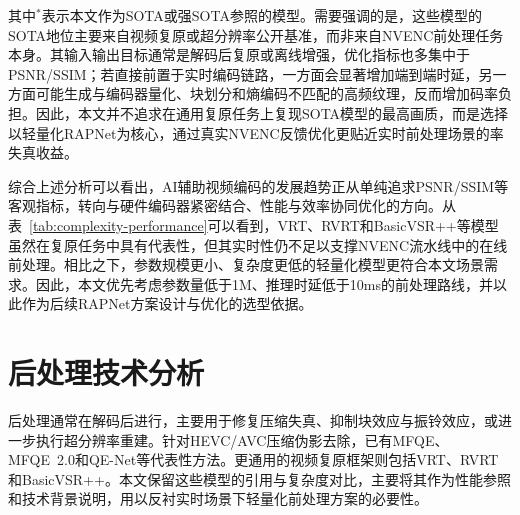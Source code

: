 \begin{table}[htbp]
  \centering
  \caption{主流模型复杂度与性能综合对比}
  \label{tab:complexity-performance}
  \small
  \setlength{\tabcolsep}{4pt}
\end{table}

其中$^{\ast}$表示本文作为SOTA或强SOTA参照的模型。需要强调的是，这些模型的SOTA地位主要来自视频复原或超分辨率公开基准，而非来自NVENC前处理任务本身。其输入输出目标通常是解码后复原或离线增强，优化指标也多集中于PSNR/SSIM；若直接前置于实时编码链路，一方面会显著增加端到端时延，另一方面可能生成与编码器量化、块划分和熵编码不匹配的高频纹理，反而增加码率负担。因此，本文并不追求在通用复原任务上复现SOTA模型的最高画质，而是选择以轻量化RAPNet为核心，通过真实NVENC反馈优化更贴近实时前处理场景的率失真收益。

综合上述分析可以看出，AI辅助视频编码的发展趋势正从单纯追求PSNR/SSIM等客观指标，转向与硬件编码器紧密结合、性能与效率协同优化的方向\cite{ref16-ding2021advances}。从表~\ref{tab:complexity-performance}可以看到，VRT、RVRT和BasicVSR++等模型虽然在复原任务中具有代表性，但其实时性仍不足以支撑NVENC流水线中的在线前处理。相比之下，参数规模更小、复杂度更低的轻量化模型更符合本文场景需求。因此，本文优先考虑参数量低于1M、推理时延低于10ms的前处理路线，并以此作为后续RAPNet方案设计与优化的选型依据。

\section{后处理技术分析}

后处理通常在解码后进行，主要用于修复压缩失真、抑制块效应与振铃效应，或进一步执行超分辨率重建\cite{ref2-chan2021basicvsr}。针对HEVC/AVC压缩伪影去除，已有MFQE\cite{ref51-yang2018mfqe}、MFQE~2.0\cite{ref52-guan2021mfqe2}和QE-Net\cite{ref55-yang2018qenet}等代表性方法。更通用的视频复原框架则包括VRT\cite{ref22-liang2022vrt}、RVRT\cite{ref23-liang2022rvrt}和BasicVSR++\cite{ref2-chan2021basicvsr,ref24-wang2022basicsr}。本文保留这些模型的引用与复杂度对比，主要将其作为性能参照和技术背景说明，用以反衬实时场景下轻量化前处理方案的必要性。

